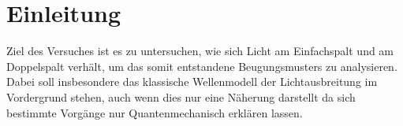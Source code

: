 \section{Einleitung}
Ziel des Versuches ist es zu untersuchen, wie sich Licht am Einfachspalt und am Doppelspalt
verhält, um das somit entstandene Beugungsmusters zu analysieren. Dabei soll
insbesondere das klassische Wellenmodell der Lichtausbreitung im Vordergrund stehen,
auch wenn dies nur eine Näherung darstellt da sich bestimmte Vorgänge nur Quantenmechanisch
erklären lassen.
\label{sec:Einleitung}